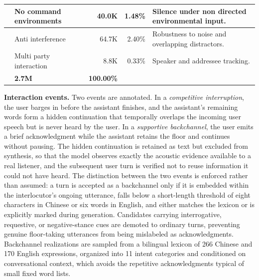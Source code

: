 \begin{table}[t]
\begin{tabularx}{\textwidth}{
        @{}
        >{\raggedright\arraybackslash}m{2.25cm}
        >{\raggedright\arraybackslash}p{4.2cm}
        r
        r
        >{\raggedright\arraybackslash}X
        @{}
    }
        \cmidrule(lr){2-5}

        &
        No command environments
        &
        40.0K
        &
        1.48\%
        &
        Silence under non directed environmental input.
        \\

        \cmidrule(lr){2-5}

        &
        Anti interference
        &
        64.7K
        &
        2.40\%
        &
        Robustness to noise and overlapping distractors.
        \\

        \cmidrule(lr){2-5}

        &
        Multi party interaction
        &
        8.8K
        &
        0.33\%
        &
        Speaker and addressee tracking.
        \\

        \midrule

        \multicolumn{2}{l}{\textbf{Total}}
        &
        \textbf{2.7M}
        &
        \textbf{100.00\%}
        &
         \\

        \bottomrule
    \end{tabularx}
\end{table}




\textbf{Interaction events.} Two events are annotated. In a \textit{competitive interruption}, the user barges in before the assistant finishes, and the assistant's remaining words form a hidden continuation that temporally overlaps the incoming user speech but is never heard by the user. In a \textit{supportive backchannel}, the user emits a brief acknowledgment while the assistant retains the floor and continues without pausing. The hidden continuation is retained as text but excluded from synthesis, so that the model observes exactly the acoustic evidence available to a real listener, and the subsequent user turn is verified not to reuse information it could not have heard. The distinction between the two events is enforced rather than assumed: a turn is accepted as a backchannel only if it is embedded within the interlocutor's ongoing utterance, falls below a short-length threshold of eight characters in Chinese or six words in English, and either matches the lexicon or is explicitly marked during generation. Candidates carrying interrogative, requestive, or negative-stance cues are demoted to ordinary turns, preventing genuine floor-taking utterances from being mislabeled as acknowledgments. Backchannel realizations are sampled from a bilingual lexicon of 266 Chinese and 170 English expressions, organized into 11 intent categories and conditioned on conversational context, which avoids the repetitive acknowledgments typical of small fixed word lists.


